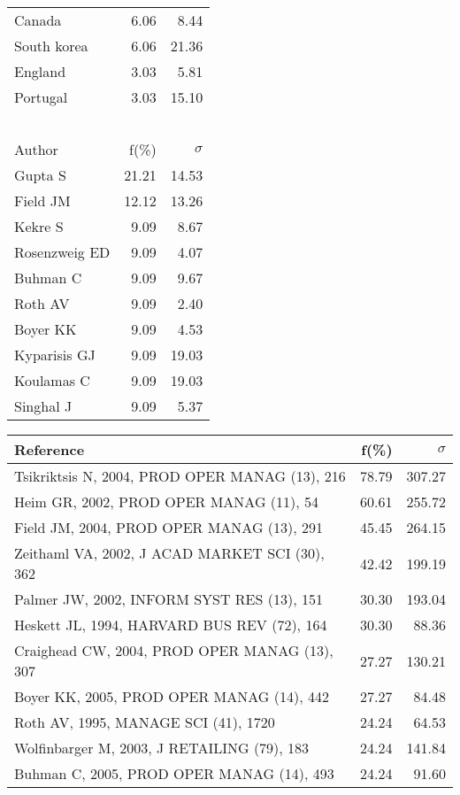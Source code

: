 \documentclass[a4paper,11pt]{report}
\begin{document}
\begin{landscape}
\begin{table}[!ht]
{\begin{tabular}{|l r r|}
Canada & 6.06 & 8.44\\
South korea & 6.06 & 21.36\\
England & 3.03 & 5.81\\
Portugal & 3.03 & 15.10\\
 &  & \\
 &  & \\
 &  & \\
 &  & \\
 &  & \\
\hline
\hline
Author & f(\%) & $\sigma$\\
\hline
Gupta S & 21.21 & 14.53\\
Field JM & 12.12 & 13.26\\
Kekre S & 9.09 & 8.67\\
Rosenzweig ED & 9.09 & 4.07\\
Buhman C & 9.09 & 9.67\\
Roth AV & 9.09 & 2.40\\
Boyer KK & 9.09 & 4.53\\
Kyparisis GJ & 9.09 & 19.03\\
Koulamas C & 9.09 & 19.03\\
Singhal J & 9.09 & 5.37\\
\hline
\end{tabular}
}
{\scriptsize\begin{tabular}{|l r r|}
\hline
Reference & f(\%) & $\sigma$\\
\hline
Tsikriktsis N, 2004, PROD OPER MANAG (13), 216 & 78.79 & 307.27\\
Heim GR, 2002, PROD OPER MANAG (11), 54 & 60.61 & 255.72\\
Field JM, 2004, PROD OPER MANAG (13), 291 & 45.45 & 264.15\\
Zeithaml VA, 2002, J ACAD MARKET SCI (30), 362 & 42.42 & 199.19\\
Palmer JW, 2002, INFORM SYST RES (13), 151 & 30.30 & 193.04\\
Heskett JL, 1994, HARVARD BUS REV (72), 164 & 30.30 & 88.36\\
Craighead CW, 2004, PROD OPER MANAG (13), 307 & 27.27 & 130.21\\
Boyer KK, 2005, PROD OPER MANAG (14), 442 & 27.27 & 84.48\\
Roth AV, 1995, MANAGE SCI (41), 1720 & 24.24 & 64.53\\
Wolfinbarger M, 2003, J RETAILING (79), 183 & 24.24 & 141.84\\
Buhman C, 2005, PROD OPER MANAG (14), 493 & 24.24 & 91.60\\

\end{tabular}}
\end{table}
\end{landscape}
\end{document}
